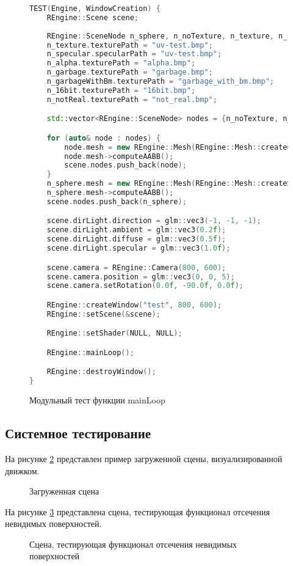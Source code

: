 \begin{figure}[ht]
\begin{lstlisting}[language=C++]
TEST(Engine, WindowCreation) {
    REngine::Scene scene;
    
    REngine::SceneNode n_sphere, n_noTexture, n_texture, n_specular, n_alpha, n_garbage, n_garbageWithBm, n_16bit, n_notReal;
    n_texture.texturePath = "uv-test.bmp";
    n_specular.specularPath = "uv-test.bmp";
    n_alpha.texturePath = "alpha.bmp";
    n_garbage.texturePath = "garbage.bmp";
    n_garbageWithBm.texturePath = "garbage_with_bm.bmp";
    n_16bit.texturePath = "16bit.bmp";
    n_notReal.texturePath = "not_real.bmp";

    std::vector<REngine::SceneNode> nodes = {n_noTexture, n_texture, n_specular, n_alpha, n_garbage, n_garbageWithBm, n_16bit, n_notReal};

    for (auto& node : nodes) {
        node.mesh = new REngine::Mesh(REngine::Mesh::createCube());
        node.mesh->computeAABB();
        scene.nodes.push_back(node);
    }
    n_sphere.mesh = new REngine::Mesh(REngine::Mesh::createSphere());
    n_sphere.mesh->computeAABB();
    scene.nodes.push_back(n_sphere);

    scene.dirLight.direction = glm::vec3(-1, -1, -1);
    scene.dirLight.ambient = glm::vec3(0.2f);
    scene.dirLight.diffuse = glm::vec3(0.5f);
    scene.dirLight.specular = glm::vec3(1.0f);

    scene.camera = REngine::Camera(800, 600);
    scene.camera.position = glm::vec3(0, 0, 5);
    scene.camera.setRotation(0.0f, -90.0f, 0.0f);

    REngine::createWindow("test", 800, 600);
    REngine::setScene(&scene);

    REngine::setShader(NULL, NULL);

    REngine::mainLoop();

    REngine::destroyWindow();
}
\end{lstlisting}  
\caption{Модульный тест функции mainLoop}
\label{unitMainLoop:image}
\end{figure}
\clearpage

\subsection{Системное тестирование}

На рисунке \ref{scene:image} представлен пример загруженной сцены, визуализированной движком.
\begin{figure}[H] %
\caption{Загруженная сцена}
\label{scene:image}
\end{figure}

На рисунке \ref{culling:image} представлена сцена, тестирующая функционал отсечения невидимых поверхностей.

\begin{figure}[ht]
\caption{Сцена, тестирующая функционал отсечения невидимых поверхностей}
\label{culling:image}
\end{figure}
